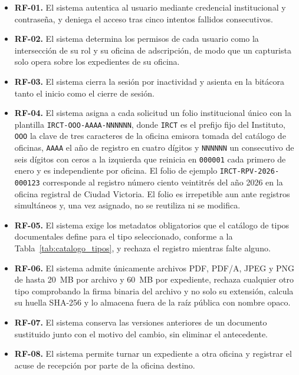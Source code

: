 \begin{description}[leftmargin=0pt,font=\bfseries,itemsep=0.6em,parsep=0pt]
  \item[M1. Autenticación y control de acceso]\leavevmode
  \begin{itemize}[nosep,leftmargin=1.4em,topsep=1pt]
    \item \textbf{RF-01.} El sistema autentica al usuario mediante credencial institucional y contraseña, y deniega el acceso tras cinco intentos fallidos consecutivos.
    \item \textbf{RF-02.} El sistema determina los permisos de cada usuario como la intersección de su rol y su oficina de adscripción, de modo que un capturista solo opera sobre los expedientes de su oficina.
    \item \textbf{RF-03.} El sistema cierra la sesión por inactividad y asienta en la bitácora tanto el inicio como el cierre de sesión.
  \end{itemize}

  \item[M2. Solicitud y carga de documentos]\leavevmode
  \begin{itemize}[nosep,leftmargin=1.4em,topsep=1pt]
    \item \textbf{RF-04.} El sistema asigna a cada solicitud un folio institucional único con la plantilla \texttt{IRCT-OOO-AAAA-NNNNNN}, donde \texttt{IRCT} es el prefijo fijo del Instituto, \texttt{OOO} la clave de tres caracteres de la oficina emisora tomada del catálogo de oficinas, \texttt{AAAA} el año de registro en cuatro dígitos y \texttt{NNNNNN} un consecutivo de seis dígitos con ceros a la izquierda que reinicia en \texttt{000001} cada primero de enero y es independiente por oficina. El folio de ejemplo \texttt{IRCT-RPV-2026-000123} corresponde al registro número ciento veintitrés del año 2026 en la oficina registral de Ciudad Victoria. El folio es irrepetible aun ante registros simultáneos y, una vez asignado, no se reutiliza ni se modifica.
    \item \textbf{RF-05.} El sistema exige los metadatos obligatorios que el catálogo de tipos documentales define para el tipo seleccionado, conforme a la Tabla~\ref{tab:catalogo_tipos}, y rechaza el registro mientras falte alguno.
    \item \textbf{RF-06.} El sistema admite únicamente archivos PDF, PDF/A, JPEG y PNG de hasta 20~MB por archivo y 60~MB por expediente, rechaza cualquier otro tipo comprobando la firma binaria del archivo y no solo su extensión, calcula su huella SHA-256 y lo almacena fuera de la raíz pública con nombre opaco.
    \item \textbf{RF-07.} El sistema conserva las versiones anteriores de un documento sustituido junto con el motivo del cambio, sin eliminar el antecedente.
    \item \textbf{RF-08.} El sistema permite turnar un expediente a otra oficina y registrar el acuse de recepción por parte de la oficina destino.
  \end{itemize}


\end{description}
